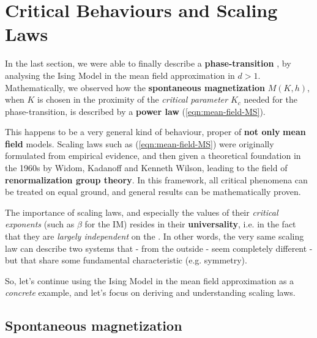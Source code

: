 \documentclass[../../main.tex]{subfiles}
\begin{document}
\section{Critical Behaviours and Scaling Laws}

In the last section, we were able to finally describe a \textbf{phase-transition} , by analysing the Ising Model in the mean field approximation in $d > 1$. Mathematically, we observed how the \textbf{spontaneous magnetization} $M(K, h)$, when $K$ is chosen in the proximity of the \textit{critical parameter} $K_c$ needed for the phase-transition, is described by a \textbf{power law} (\ref{eqn:mean-field-MS}).

\medskip

This happens to be a very general kind of behaviour, proper of \textbf{not only} \textbf{mean field} models.
Scaling laws such as (\ref{eqn:mean-field-MS}) were originally formulated from empirical evidence, and then given a theoretical foundation in the 1960s by Widom, Kadanoff and Kenneth Wilson, leading to the field of \textbf{renormalization group theory}. In this framework, all critical phenomena can be treated on equal ground, and general results can be mathematically proven. 

\medskip

The importance of scaling laws, and especially the values of their \textit{critical exponents} (such as $\beta$ for the IM) resides in their \textbf{universality}, i.e. in the fact that they are \textit{largely independent} on the . In other words, the very same scaling law can describe two systems that - from the outside - seem completely different - but that share some fundamental characteristic (e.g. symmetry). 

\medskip

So, let's continue using the Ising Model in the mean field approximation as a \textit{concrete} example, and let's focus on deriving and understanding scaling laws.

\subsection{Spontaneous magnetization}
\end{document}
